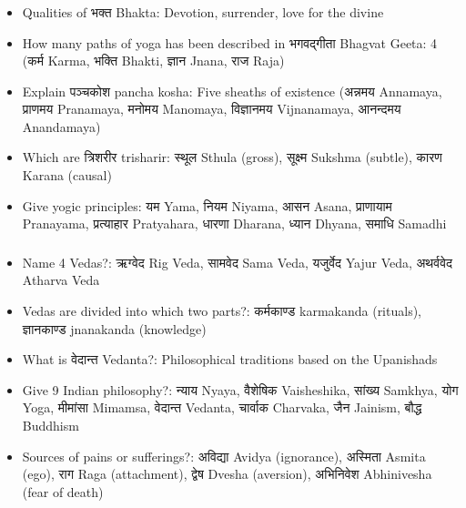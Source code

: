 \begin{frame}[fragile]\frametitle{}
\begin{itemize}
\item Qualities of भक्त Bhakta: Devotion, surrender, love for the divine
\item How many paths of yoga has been described in भगवद्गीता Bhagvat Geeta: 4 (कर्म Karma, भक्ति Bhakti, ज्ञान Jnana, राज Raja)
\item Explain पञ्चकोश pancha kosha: Five sheaths of existence (अन्नमय Annamaya, प्राणमय Pranamaya, मनोमय Manomaya, विज्ञानमय Vijnanamaya, आनन्दमय Anandamaya)
\item Which are त्रिशरीर trisharir: स्थूल Sthula (gross), सूक्ष्म Sukshma (subtle), कारण Karana (causal)
\item Give yogic principles: यम Yama, नियम Niyama, आसन Asana, प्राणायाम Pranayama, प्रत्याहार Pratyahara, धारणा Dharana, ध्यान Dhyana, समाधि Samadhi
\end{itemize}
\end{frame}

\begin{frame}[fragile]\frametitle{}
\begin{itemize}
\item Name 4 Vedas?: ऋग्वेद Rig Veda, सामवेद Sama Veda, यजुर्वेद Yajur Veda, अथर्ववेद Atharva Veda
\item Vedas are divided into which two parts?: कर्मकाण्ड karmakanda (rituals), ज्ञानकाण्ड jnanakanda (knowledge)
\item What is वेदान्त Vedanta?: Philosophical traditions based on the Upanishads
\item Give 9 Indian philosophy?: न्याय Nyaya, वैशेषिक Vaisheshika, सांख्य Samkhya, योग Yoga, मीमांसा Mimamsa, वेदान्त Vedanta, चार्वाक Charvaka, जैन Jainism, बौद्ध Buddhism
\item Sources of pains or sufferings?: अविद्या Avidya (ignorance), अस्मिता Asmita (ego), राग Raga (attachment), द्वेष Dvesha (aversion), अभिनिवेश Abhinivesha (fear of death)
\end{itemize}
\end{frame}

